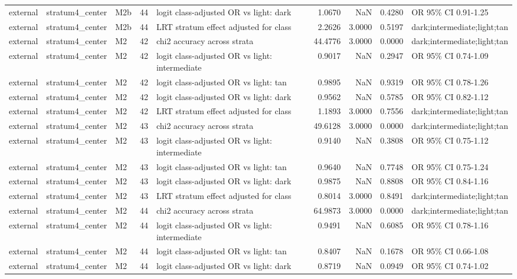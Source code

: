 \begin{tabular}{lllrlrrrl}
external & stratum4\_center & M2b & 44 & logit class-adjusted OR vs light: dark & 1.0670 & NaN & 0.4280 & OR 95\% CI 0.91-1.25 \\
external & stratum4\_center & M2b & 44 & LRT stratum effect adjusted for class & 2.2626 & 3.0000 & 0.5197 & dark;intermediate;light;tan \\
external & stratum4\_center & M2 & 42 & chi2 accuracy across strata & 44.4776 & 3.0000 & 0.0000 & dark;intermediate;light;tan \\
external & stratum4\_center & M2 & 42 & logit class-adjusted OR vs light: intermediate & 0.9017 & NaN & 0.2947 & OR 95\% CI 0.74-1.09 \\
external & stratum4\_center & M2 & 42 & logit class-adjusted OR vs light: tan & 0.9895 & NaN & 0.9319 & OR 95\% CI 0.78-1.26 \\
external & stratum4\_center & M2 & 42 & logit class-adjusted OR vs light: dark & 0.9562 & NaN & 0.5785 & OR 95\% CI 0.82-1.12 \\
external & stratum4\_center & M2 & 42 & LRT stratum effect adjusted for class & 1.1893 & 3.0000 & 0.7556 & dark;intermediate;light;tan \\
external & stratum4\_center & M2 & 43 & chi2 accuracy across strata & 49.6128 & 3.0000 & 0.0000 & dark;intermediate;light;tan \\
external & stratum4\_center & M2 & 43 & logit class-adjusted OR vs light: intermediate & 0.9140 & NaN & 0.3808 & OR 95\% CI 0.75-1.12 \\
external & stratum4\_center & M2 & 43 & logit class-adjusted OR vs light: tan & 0.9640 & NaN & 0.7748 & OR 95\% CI 0.75-1.24 \\
external & stratum4\_center & M2 & 43 & logit class-adjusted OR vs light: dark & 0.9875 & NaN & 0.8808 & OR 95\% CI 0.84-1.16 \\
external & stratum4\_center & M2 & 43 & LRT stratum effect adjusted for class & 0.8014 & 3.0000 & 0.8491 & dark;intermediate;light;tan \\
external & stratum4\_center & M2 & 44 & chi2 accuracy across strata & 64.9873 & 3.0000 & 0.0000 & dark;intermediate;light;tan \\
external & stratum4\_center & M2 & 44 & logit class-adjusted OR vs light: intermediate & 0.9491 & NaN & 0.6085 & OR 95\% CI 0.78-1.16 \\
external & stratum4\_center & M2 & 44 & logit class-adjusted OR vs light: tan & 0.8407 & NaN & 0.1678 & OR 95\% CI 0.66-1.08 \\
external & stratum4\_center & M2 & 44 & logit class-adjusted OR vs light: dark & 0.8719 & NaN & 0.0949 & OR 95\% CI 0.74-1.02 \\

\end{tabular}
